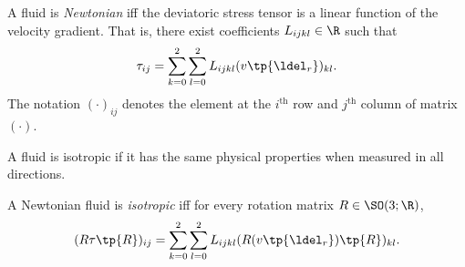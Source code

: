 \begin{df}
    A fluid is \emph{Newtonian} iff the deviatoric stress tensor is a linear function of the velocity gradient.
    That is, there exist coefficients
    $L_{ijkl}\in \R$ such that
    \begin{equation}
        \tau_{ij} = \sum_{k=0}^2 \sum_{l=0}^2 L_{ijkl} (v\tp{\ldel_r})_{kl}.
    \end{equation}
    The notation $(\cdot)_{ij}$ denotes the element at the $i^\text{th}$ row and $j^\text{th}$ column of matrix $(\cdot)$.
\end{df}

\begin{rk}
A fluid is isotropic if it has the same physical properties when measured
in all directions.
\end{rk}

\begin{df}
    A Newtonian fluid is \emph{isotropic} iff for every rotation matrix $R\in \SO(3;\R)$,
    \begin{equation}
        (R\tau \tp{R})_{ij} = \sum_{k=0}^2 \sum_{l=0}^2 L_{ijkl} (R(v\tp{\ldel_r})\tp{R})_{kl}.
    \end{equation}
\end{df}

